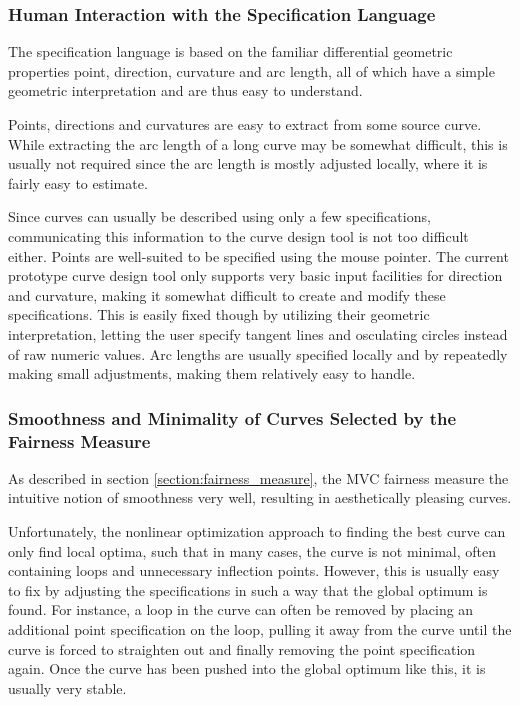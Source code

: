\documentclass[a4paper]{article}
\begin{document}
			\subsubsection{Human Interaction with the Specification Language}
			\label{section:human_interaction_specification_language}

				The specification language is based on the familiar differential geometric properties point, direction, curvature and arc length, all of which have a simple geometric interpretation and are thus easy to understand.

				Points, directions and curvatures are easy to extract from some source curve. While extracting the arc length of a long curve may be somewhat difficult, this is usually not required since the arc length is mostly adjusted locally, where it is fairly easy to estimate.

				Since curves can usually be described using only a few specifications, communicating this information to the curve design tool is not too difficult either. Points are well-suited to be specified using the mouse pointer. The current prototype curve design tool only supports very basic input facilities for direction and curvature, making it somewhat difficult to create and modify these specifications. This is easily fixed though by utilizing their geometric interpretation, letting the user specify tangent lines and osculating circles instead of raw numeric values. Arc lengths are usually specified locally and by repeatedly making small adjustments, making them relatively easy to handle.

			\subsubsection{Smoothness and Minimality of Curves Selected by the Fairness Measure}
			\label{section:smoothness_minimality_curves_selected_fairness_measure}

				As described in section \ref{section:fairness_measure}, the MVC fairness measure the intuitive notion of smoothness very well, resulting in aesthetically pleasing curves.

				Unfortunately, the nonlinear optimization approach to finding the best curve can only find local optima, such that in many cases, the curve is not minimal, often containing loops and unnecessary inflection points. However, this is usually easy to fix by adjusting the specifications in such a way that the global optimum is found. For instance, a loop in the curve can often be removed by placing an additional point specification on the loop, pulling it away from the curve until the curve is forced to straighten out and finally removing the point specification again. Once the curve has been pushed into the global optimum like this, it is usually very stable.
\end{document}
